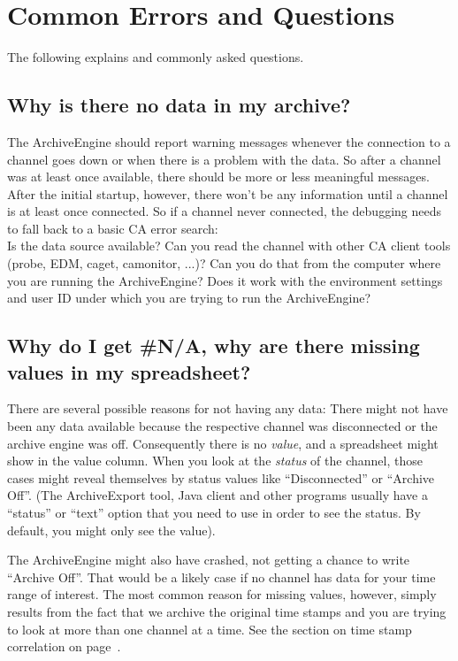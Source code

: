 \chapter{Common Errors and Questions}

The following explains  and commonly
asked questions.

\section{Why is there no data in my archive?}
The ArchiveEngine should report warning messages whenever the
connection to a channel goes down or when there is a problem with the
data. So after a channel was at least once available, there should be
more or less meaningful messages. After the initial startup, however,
there won't be any information until a channel is at least once
connected. So if a channel never connected, the debugging needs to
fall back to a basic CA error search:\\
Is the data source available?
Can you read the channel with other CA client tools
(probe, EDM, caget, camonitor, ...)?
Can you do that from the computer where you are running
the ArchiveEngine? Does it work with the environment settings and user
ID under which you are trying to run the ArchiveEngine?

\section{Why do I get \#N/A, why are there missing values in my spreadsheet?}
There are several possible reasons for not having any data: There
might not have been any data available because the respective channel
was disconnected or the archive engine was off.  Consequently there is
no \emph{value}, and a spreadsheet might show
 in the value column. When you look at the
\emph{status} of the channel, those cases might reveal themselves by status
values like ``Disconnected'' or ``Archive Off''.  (The ArchiveExport
tool, Java client and other programs usually have a ``status'' or
``text'' option that you need to use in order to see the status. By
default, you might only see the value).
 
The ArchiveEngine might also have crashed, not getting a chance to
write ``Archive Off''. That would be a likely case if no channel has
data for your time range of interest.  The most common reason for
missing values, however, simply results from the fact that we archive
the original time stamps and you are trying to look at more than one
channel at a time. See the section on time stamp correlation on page~\pageref{sec:timestampcorr}.  

